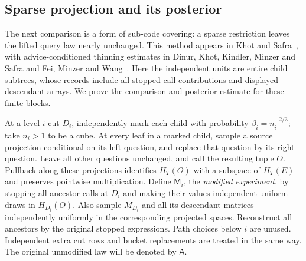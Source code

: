 \subsection{Sparse projection and its posterior}

The next comparison is a form of sub-code covering: a sparse restriction
leaves the lifted query law nearly unchanged.  This method appears in
Khot and Safra~\cite[Section~3.4]{KhotSafra2013}, with advice-conditioned
thinning estimates in Dinur, Khot, Kindler, Minzer and Safra
\cite[Lemma~5.5, full version]{DinurKhotKindlerMinzerSafra2018} and
Fei, Minzer and Wang~\cite[Propositions~4.7--4.8 and~5.5]{FeiMinzerWang2026}.
Here the independent units are entire child subtrees, whose records include
all stopped-call contributions and displayed descendant arrays.  We prove
the comparison and posterior estimate for these finite blocks.

At a level-$i$ cut $D_i$, independently mark each child with probability
$\beta_i=n_i^{-2/3}$; take $n_i>1$ to be a cube.  At every leaf in a marked
child, sample a source projection conditional on its left question, and
replace that question by its right question.  Leave all other questions
unchanged, and call the resulting tuple $O$.  Pullback along these
projections identifies $H_T(O)$ with a subspace of $H_T(E)$ and preserves
pointwise multiplication.  Define $\mathsf M_i$, the \emph{modified
experiment}, by stopping all ancestor calls at $D_i$ and making their values
independent uniform draws in $H_{D_i}(O)$.  Also sample $M_{D_i}$ and all its
descendant matrices independently uniformly in the corresponding projected
spaces.  Reconstruct all ancestors by the original stopped expressions.
Path choices below $i$ are unused.  Independent extra cut rows and bucket
replacements are treated in the same way.  The original unmodified law will
be denoted by $\mathsf A$.

